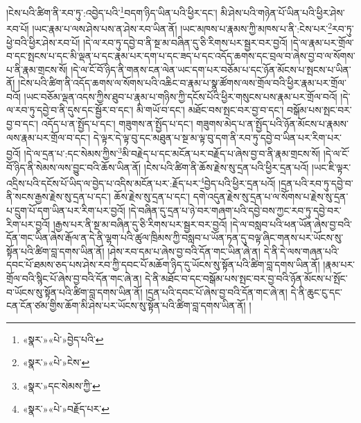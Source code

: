 །ངེས་པའི་ཚིག་ནི་རབ་ཏུ་:འབྱེད་པའི་\footnote{«སྣར་»«པེ་»བྱེད་པའི་}བདག་ཉིད་ཡིན་པའི་ཕྱིར་དང་། མི་ཤེས་པའི་གཉེན་པོ་ཡིན་པའི་ཕྱིར་ཤེས་རབ་པོ། །ཡང་རྣམ་པ་ལས་ཤེས་པས་ན་ཤེས་རབ་ཡིན་ནོ། །ཡང་མཁས་པ་རྣམས་ཀྱི་མཁས་པ་ནི་:ངེས་པར་\footnote{«སྣར་»«པེ་»ངེས་}རབ་ཏུ་ཕྱེ་བའི་ཕྱིར་ཤེས་རབ་པོ། །དེ་ལ་རབ་ཏུ་དབྱེ་བ་ནི་སྔ་མ་བཞིན་དུ་ཅི་རིགས་པར་སྦྱར་བར་བྱའོ། །དེ་ལ་རྣམ་པར་གྲོལ་བ་དང་སྤངས་པ་དང་མི་ལྡན་པ་དང་རྣམ་པར་དག་པ་དང་ཟད་པ་དང་འདོད་ཆགས་དང་བྲལ་བ་ཞེས་བྱ་བ་ལ་སོགས་པ་ནི་རྣམ་གྲངས་སོ། །དེ་ལ་ངོ་བོ་ཉིད་ནི་གནས་ངན་ལེན་ཡང་དག་པར་བཅོམ་པ་དང་ཉོན་མོངས་པ་སྤངས་པ་ཡིན་ནོ། །ངེས་པའི་ཚིག་ནི་འདོད་ཆགས་ལ་སོགས་པའི་འཆིང་བ་རྣམ་པ་སྣ་ཚོགས་ལས་གྲོལ་བའི་ཕྱིར་རྣམ་པར་གྲོལ་བའོ། །ཡང་བཅོམ་ལྡན་འདས་ཀྱིས་ཐུབ་པ་རྣམ་པ་གཉིས་ཀྱི་དངོས་པོའི་ཕྱིར་གསུངས་པས་རྣམ་པར་གྲོལ་བའོ། །དེ་ལ་རབ་ཏུ་དབྱེ་བ་ནི་དུས་དང་སྦྱོར་བ་དང་། མི་གཡོ་བ་དང་། མཐོང་བས་སྤང་བར་བྱ་བ་དང་། བསྒོམ་པས་སྤང་བར་བྱ་བ་དང་། འདོད་པ་ན་སྤྱོད་པ་དང་། གཟུགས་ན་སྤྱོད་པ་དང་། གཟུགས་མེད་པ་ན་སྤྱོད་པའི་ཉོན་མོངས་པ་རྣམས་ལས་རྣམ་པར་གྲོལ་བ་དང་། དེ་ལྟར་དེ་ལྟ་བུ་དང་མཐུན་པ་སྔ་མ་ལྟ་བུ་དག་ནི་རབ་ཏུ་དབྱེ་བ་ཡིན་པར་རིག་པར་བྱའོ། །དེ་ལ་དྲན་པ་:དང་སེམས་ཀྱིས་\footnote{«སྣར་»དང་སེམས་ཀྱི་}མི་བརྗེད་པ་དང་མངོན་པར་བརྗོད་པ་ཞེས་བྱ་བ་ནི་རྣམ་གྲངས་སོ། །དེ་ལ་ངོ་བོ་ཉིད་ནི་སེམས་ལས་བྱུང་བའི་ཆོས་ཡིན་ནོ། །ངེས་པའི་ཚིག་ནི་ཆོས་རྗེས་སུ་དྲན་པའི་ཕྱིར་དྲན་པའོ། །ཡང་ཇི་ལྟར་འདྲིས་པའི་དངོས་པོ་ཡིད་ལ་བྱེད་པ་འདིས་མངོན་པར་:རྗོད་པར་\footnote{«སྣར་»«པེ་»བརྗོད་པར་}བྱེད་པའི་ཕྱིར་དྲན་པའོ། །དྲན་པའི་རབ་ཏུ་དབྱེ་བ་ནི་སངས་རྒྱས་རྗེས་སུ་དྲན་པ་དང་། ཆོས་རྗེས་སུ་དྲན་པ་དང་། དགེ་འདུན་རྗེས་སུ་དྲན་པ་ལ་སོགས་པ་རྗེས་སུ་དྲན་པ་དྲུག་པོ་དག་ཡིན་པར་རིག་པར་བྱའོ། །དེ་བཞིན་དུ་དྲན་པ་ཉེ་བར་གཞག་པའི་དབྱེ་བས་ཀྱང་རབ་ཏུ་དབྱེ་བར་རིག་པར་བྱའོ། །རྒྱས་པར་ནི་སྔ་མ་བཞིན་དུ་ཅི་རིགས་པར་སྦྱར་བར་བྱའོ། །དེ་ལ་བསླབ་པའི་ཕན་ཡོན་ཞེས་བྱ་བའི་དོན་གང་ཡིན་ཞེས་རྒོལ་ན་དེ་ནི་ལྷག་པའི་ཚུལ་ཁྲིམས་ཀྱི་བསླབ་པ་ཡོན་ཏན་དུ་བལྟ་ཞིང་གནས་པར་ཡོངས་སུ་སྟོན་པའི་ཚིག་བླ་དགས་ཡིན་ནོ། །ཤེས་རབ་དམ་པ་ཞེས་བྱ་བའི་དོན་གང་ཡིན་ཞེ་ན། དེ་ནི་དེ་ལས་གཞན་པའི་དབང་པོ་ཐམས་ཅད་པས་ཤེས་རབ་ཀྱི་དབང་པོ་མཆོག་ཉིད་དུ་ཡོངས་སུ་སྟོན་པའི་ཚིག་བླ་དགས་ཡིན་ནོ། །རྣམ་པར་གྲོལ་བའི་སྙིང་པོ་ཞེས་བྱ་བའི་དོན་གང་ཞེ་ན། དེ་ནི་མཐོང་བ་དང་བསྒོམ་པས་སྤང་བར་བྱ་བའི་ཉོན་མོངས་པ་སྤོང་བ་ཡོངས་སུ་སྟོན་པའི་ཚིག་བླ་དགས་ཡིན་ནོ། །དྲན་པའི་དབང་པོ་ཞེས་བྱ་བའི་དོན་གང་ཞེ་ན། དེ་ནི་ཆུང་ངུ་དང་ངན་ངོན་ཙམ་གྱིས་ཆོག་མི་ཤེས་པར་ཡོངས་སུ་སྟོན་པའི་ཚིག་བླ་དགས་ཡིན་ནོ། །
